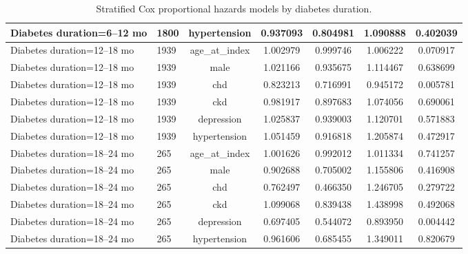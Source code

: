 \documentclass[twoside,11pt]{article}
\begin{document}
\begin{table}[H]
\begin{adjustbox}{max width=\textwidth}
\begin{tabular}{llccccc}
      Diabetes duration=6--12 mo  & 1800       & hypertension       & 0.937093    & 0.804981        & 1.090888         & 0.402039                       \\
      \hline
      Diabetes duration=12--18 mo & 1939       & age\_at\_index     & 1.002979    & 0.999746        & 1.006222         & 0.070917                       \\
      Diabetes duration=12--18 mo & 1939       & male               & 1.021166    & 0.935675        & 1.114467         & 0.638699                       \\
      Diabetes duration=12--18 mo & 1939       & chd                & 0.823213    & 0.716991        & 0.945172         & \cellcolor{lightgreen}0.005781 \\
      Diabetes duration=12--18 mo & 1939       & ckd                & 0.981917    & 0.897683        & 1.074056         & 0.690061                       \\
      Diabetes duration=12--18 mo & 1939       & depression         & 1.025837    & 0.939003        & 1.120701         & 0.571883                       \\
      Diabetes duration=12--18 mo & 1939       & hypertension       & 1.051459    & 0.916818        & 1.205874         & 0.472917                       \\
      \hline
      Diabetes duration=18--24 mo & 265        & age\_at\_index     & 1.001626    & 0.992012        & 1.011334         & 0.741257                       \\
      Diabetes duration=18--24 mo & 265        & male               & 0.902688    & 0.705002        & 1.155806         & 0.416908                       \\
      Diabetes duration=18--24 mo & 265        & chd                & 0.762497    & 0.466350        & 1.246705         & 0.279722                       \\
      Diabetes duration=18--24 mo & 265        & ckd                & 1.099068    & 0.839438        & 1.438998         & 0.492068                       \\
      Diabetes duration=18--24 mo & 265        & depression         & 0.697405    & 0.544072        & 0.893950         & \cellcolor{lightgreen}0.004442 \\
      Diabetes duration=18--24 mo & 265        & hypertension       & 0.961606    & 0.685455        & 1.349011         & 0.820679                       \\
      \hline
    \end{tabular}
  \end{adjustbox}
  \caption{Stratified Cox proportional hazards models by diabetes duration.}
  \label{tab:stratified_cox}
\end{table}
\end{document}

